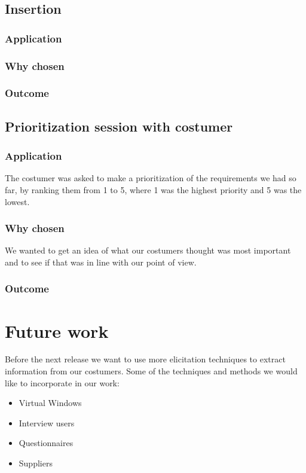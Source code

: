 \documentclass[a4paper]{article}
\begin{document}
  \subsection{Insertion}
    \subsubsection{Application}
    \subsubsection{Why chosen}
    \subsubsection{Outcome}
    
  \subsection{Prioritization session with costumer}
    \subsubsection{Application}
      The costumer was asked to make a prioritization of the requirements we had so far, by ranking them from 1 to 5, where 1 was the highest priority and 5 was the lowest.
    \subsubsection{Why chosen}
      We wanted to get an idea of what our costumers thought was most important and to see if that was in line with our point of view.
    \subsubsection{Outcome}

  

  \section{Future work}
Before the next release we want to use more elicitation techniques to extract
information from our costumers. Some of the techniques and methods we would
like to incorporate in our work:

  \begin{itemize}
  	\item Virtual Windows
  	\item Interview users
  	\item Questionnaires
  	\item Suppliers 
  \end{itemize}
 
\end{document}
